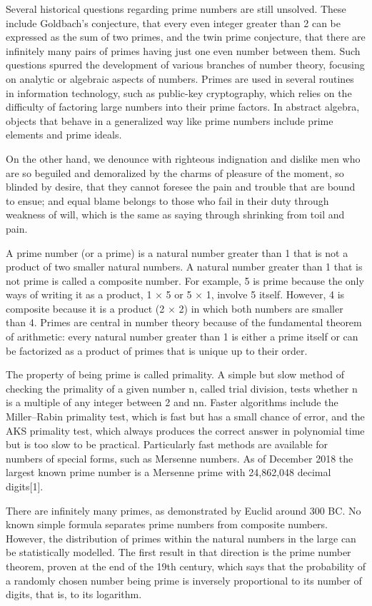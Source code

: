 Several historical questions regarding prime numbers are still unsolved. These
include Goldbach's conjecture, that every even integer greater than 2 can be
expressed as the sum of two primes, and the twin prime conjecture, that there
are infinitely many pairs of primes having just one even number between
them. Such questions spurred the development of various branches of number
theory, focusing on analytic or algebraic aspects of numbers. Primes are used in
several routines in information technology, such as public-key cryptography,
which relies on the difficulty of factoring large numbers into their prime
factors. In abstract algebra, objects that behave in a generalized way like
prime numbers include prime elements and prime ideals.

On the other hand, we denounce with righteous indignation and dislike men who
are so beguiled and demoralized by the charms of pleasure of the moment, so
blinded by desire, that they cannot foresee the pain and trouble that are bound
to ensue; and equal blame belongs to those who fail in their duty through
weakness of will, which is the same as saying through shrinking from toil and
pain.

A prime number (or a prime) is a natural number greater than 1 that is not a
product of two smaller natural numbers. A natural number greater than 1 that is
not prime is called a composite number. For example, 5 is prime because the only
ways of writing it as a product, 1 × 5 or 5 × 1, involve 5 itself. However, 4 is
composite because it is a product (2 × 2) in which both numbers are smaller than
4. Primes are central in number theory because of the fundamental theorem of
arithmetic: every natural number greater than 1 is either a prime itself or can
be factorized as a product of primes that is unique up to their order.

The property of being prime is called primality. A simple but slow method of
checking the primality of a given number n, called trial division, tests whether
n is a multiple of any integer between 2 and { { {n}}}{ {n}}. Faster algorithms
include the Miller–Rabin primality test, which is fast but has a small chance of
error, and the AKS primality test, which always produces the correct answer in
polynomial time but is too slow to be practical. Particularly fast methods are
available for numbers of special forms, such as Mersenne numbers. As of December
2018 the largest known prime number is a Mersenne prime with 24,862,048 decimal
digits[1].

There are infinitely many primes, as demonstrated by Euclid around 300 BC. No
known simple formula separates prime numbers from composite numbers. However,
the distribution of primes within the natural numbers in the large can be
statistically modelled. The first result in that direction is the prime number
theorem, proven at the end of the 19th century, which says that the probability
of a randomly chosen number being prime is inversely proportional to its number
of digits, that is, to its logarithm.

